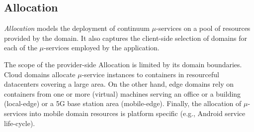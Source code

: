 


\subsection{Allocation}\label{sec:A3-E-allocation}



\textit{Allocation} models the deployment of continuum $\mu$-services on a pool of resources provided by the domain. It also captures the client-side selection of domains for each of the $\mu$-services employed by the application.


The scope of the provider-side Allocation is limited by its domain boundaries. Cloud domains allocate $\mu$-service instances to containers in resourceful datacenters covering a large area. On the other hand, edge domains rely on containers from one or more (virtual) machines serving an office or a building (local-edge) or a 5G base station area (mobile-edge). Finally, the allocation of $\mu$-services into mobile domain resources is platform specific (e.g., Android service life-cycle).

